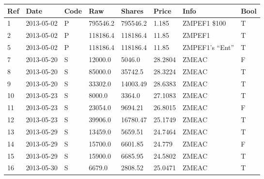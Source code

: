\documentclass{article}
\begin{document}
\begin{longtable}{llllllll}
Ref&
Date&
Code&
Raw&
Shares&
Price&
Info&
Bool\\
\endhead
1&
2013-05-02&
P&
795546.2&
795546.2&
1.185&
ZMPEF1 \$100&
T\\
2&
2013-05-02&
P&
118186.4&
118186.4&
11.85&
ZMPEF1&
T\\
5&
2013-05-02&
P&
118186.4&
118186.4&
11.85&
ZMPEF1's ``Ent''&
T\\
7&
2013-05-20&
S&
12000.0&
5046.0&
28.2804&
ZMEAC&
F\\
8&
2013-05-20&
S&
85000.0&
35742.5&
28.3224&
ZMEAC&
T\\
9&
2013-05-20&
S&
33302.0&
14003.49&
28.6383&
ZMEAC&
T\\
10&
2013-05-23&
S&
8000.0&
3364.0&
27.1083&
ZMEAC&
T\\
11&
2013-05-23&
S&
23054.0&
9694.21&
26.8015&
ZMEAC&
F\\
12&
2013-05-23&
S&
39906.0&
16780.47&
25.1749&
ZMEAC&
T\\
13&
2013-05-29&
S&
13459.0&
5659.51&
24.7464&
ZMEAC&
T\\
14&
2013-05-29&
S&
15700.0&
6601.85&
24.779&
ZMEAC&
F\\
15&
2013-05-29&
S&
15900.0&
6685.95&
24.5802&
ZMEAC&
T\\
16&
2013-05-30&
S&
6679.0&
2808.52&
25.0471&
ZMEAC&
T\\
\end{longtable}
\end{document}
